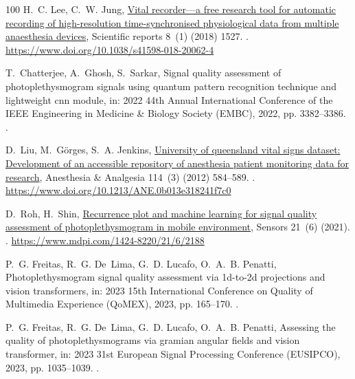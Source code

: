 \documentclass[final,3p,times,twocolumn]{elsarticle}
\begin{document}
\begin{thebibliography}{100}
H.~C. Lee, C.~W. Jung,
  \href{https://www.doi.org/10.1038/s41598-018-20062-4}{Vital recorder—a free
  research tool for automatic recording of high-resolution time-synchronised
  physiological data from multiple anaesthesia devices}, Scientific reports
  8~(1) (2018) 1527.
\newblock \href {https://doi.org/10.1038/s41598-018-20062-4}
  {}.
\newline\urlprefix\url{https://www.doi.org/10.1038/s41598-018-20062-4}

T.~Chatterjee, A.~Ghosh, S.~Sarkar, Signal quality assessment of
  photoplethysmogram signals using quantum pattern recognition technique and
  lightweight cnn module, in: 2022 44th Annual International Conference of the
  IEEE Engineering in Medicine \& Biology Society (EMBC), 2022, pp. 3382--3386.
\newblock \href {https://doi.org/10.1109/EMBC48229.2022.9871494}
  {}.

D.~Liu, M.~G{\"o}rges, S.~A. Jenkins,
  \href{https://www.doi.org/10.1213/ANE.0b013e318241f7c0}{University of
  queensland vital signs dataset: Development of an accessible repository of
  anesthesia patient monitoring data for research}, Anesthesia \& Analgesia
  114~(3) (2012) 584--589.
\newblock \href {https://doi.org/10.1213/ANE.0b013e318241f7c0}
  {}.
\newline\urlprefix\url{https://www.doi.org/10.1213/ANE.0b013e318241f7c0}

D.~Roh, H.~Shin, \href{https://www.mdpi.com/1424-8220/21/6/2188}{Recurrence
  plot and machine learning for signal quality assessment of photoplethysmogram
  in mobile environment}, Sensors 21~(6) (2021).
\newblock \href {https://doi.org/10.3390/s21062188}
  {}.
\newline\urlprefix\url{https://www.mdpi.com/1424-8220/21/6/2188}

P.~G. Freitas, R.~G. De~Lima, G.~D. Lucafo, O.~A.~B. Penatti,
  Photoplethysmogram signal quality assessment via 1d-to-2d projections and
  vision transformers, in: 2023 15th International Conference on Quality of
  Multimedia Experience (QoMEX), 2023, pp. 165--170.
\newblock \href {https://doi.org/10.1109/QoMEX58391.2023.10178569}
  {}.

P.~G. Freitas, R.~G. De~Lima, G.~D. Lucafo, O.~A.~B. Penatti, Assessing the
  quality of photoplethysmograms via gramian angular fields and vision
  transformer, in: 2023 31st European Signal Processing Conference (EUSIPCO),
  2023, pp. 1035--1039.
\newblock \href {https://doi.org/10.23919/EUSIPCO58844.2023.10290014}
  {}.


\end{thebibliography}
\end{document}
